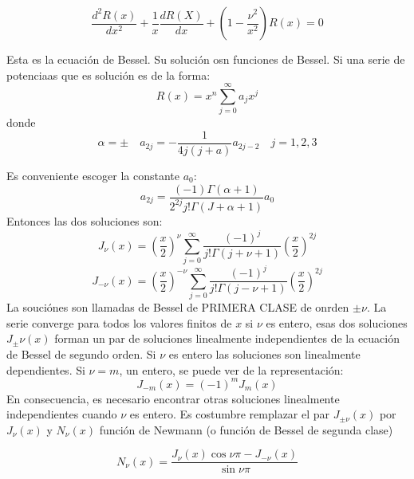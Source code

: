 \documentclass{article}
\begin{document}
\begin{equation}
    \frac{d^2 R(x)}{dx^2} + \frac{1}{x}\frac{dR(X)}{dx} + \left(1 - \frac{\nu^2}{x^2} \right) R(x) = 0
\end{equation}

Esta es la ecuación de Bessel. Su solución osn funciones de Bessel. Si una serie de potenciaas que es solución es de la forma:
\begin{equation}
R(x) = x^n \sum_{j = 0}^{\infty} a_j x^j
\end{equation}
donde
\begin{equation}
 \alpha =\pm \quad a_{2j} = -\frac{1}{4j(j+a)}a_{2j-2}\quad j = 1, 2, 3   
\end{equation}

Es conveniente escoger la constante $a_0$:
\begin{equation}
    a_{2j} = \frac{(-1)\Gamma(\alpha + 1) }{2^{2j}j!\Gamma(J + \alpha + 1)}a_0
\end{equation}
Entonces las dos soluciones son:
\begin{equation}
    J_\nu(x) = \left( \frac{x}{2}\right)^\nu \sum_{j = 0}^{\infty} \frac{(-1)^j}{j! \Gamma (j + \nu + 1)}\left ( \frac{x}{2} \right )^{2j}
\end{equation}
\begin{equation}
    J_{-\nu}(x) = \left( \frac{x}{2}\right)^{-\nu} \sum_{j = 0}^{\infty} \frac{(-1)^j}{j! \Gamma (j - \nu + 1)}\left ( \frac{x}{2} \right )^{2j}
\end{equation}
La souciónes son llamadas \funciones de Bessel de PRIMERA CLASE de onrden $\pm \nu$. La serie converge para todos los valores finitos de $x$ si $\nu$ es entero, esas dos soluciones $J_{\pm} \nu(x)$ forman un par de soluciones linealmente independientes de la ecuación de Bessel de segundo orden. Si $\nu$ es entero las soluciones son linealmente dependientes. Si $\nu = m$, un entero, se puede ver de la representación:
\begin{equation}
    J_{-m}(x) = (-1)^m J_m(x)
\end{equation}
En consecuencia, es necesario encontrar otras soluciones linealmente independientes cuando $\nu$ es entero. Es costumbre remplazar el par $J_{\pm \nu}(x)$ por $J_\nu(x)$ y $N_\nu(x)$ función de Newmann (o función de Bessel de segunda clase)

\begin{equation}
    N_\nu(x) = \frac{J_\nu(x) \cos \nu\pi - J_{-\nu}(x)}{\sin \nu \pi}
\end{equation}
\end{document}
